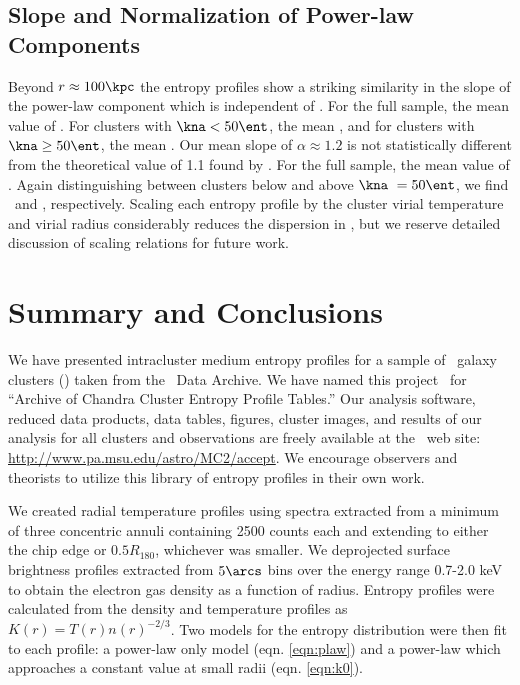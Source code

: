 \subsection{Slope and Normalization of Power-law Components}
\label{sec:entsuppslopes}

Beyond $r \approx 100 \kpc$ the entropy profiles show a striking
similarity in the slope of the power-law component which is
independent of \kna. For the full sample, the mean value of \alphafs.
For clusters with $\kna < 50 \ent$, the mean \alphaga, and for
clusters with $\kna \geq 50 \ent$, the mean \alphagb. Our mean slope of
$\alpha \approx 1.2$ is not statistically different from the
theoretical value of 1.1 found by \citet{tozzi01}. For the full
sample, the mean value of \khunfs. Again distinguishing between
clusters below and above $\kna\ = 50 \ent$, we find \khunga\ and
\khungb, respectively. Scaling each entropy profile by the cluster
virial temperature and virial radius considerably reduces the
dispersion in \khun, but we reserve detailed discussion of scaling
relations for future work.

\section{Summary and Conclusions}
\label{sec:entsuppsummary}

We have presented intracluster medium entropy profiles for a sample of
\entsuppnum\ galaxy clusters (\expt) taken from the \chandra\ Data
Archive. We have named this project \accept\ for ``Archive of Chandra
Cluster Entropy Profile Tables.'' Our analysis software, reduced data
products, data tables, figures, cluster images, and results of our
analysis for all clusters and observations are freely available at the
\accept\ web site: \url{http://www.pa.msu.edu/astro/MC2/accept}. We
encourage observers and theorists to utilize this library of entropy
profiles in their own work.

We created radial temperature profiles using spectra extracted from a
minimum of three concentric annuli containing 2500 counts each and
extending to either the chip edge or $0.5 R_{180}$, whichever was
smaller. We deprojected surface brightness profiles extracted from
$5\arcs$ bins over the energy range 0.7-2.0 keV to obtain the electron
gas density as a function of radius. Entropy profiles were calculated
from the density and temperature profiles as $K(r) =
T(r)n(r)^{-2/3}$. Two models for the entropy distribution were then
fit to each profile: a power-law only model (eqn. \ref{eqn:plaw}) and
a power-law which approaches a constant value at small radii
(eqn. \ref{eqn:k0}).

